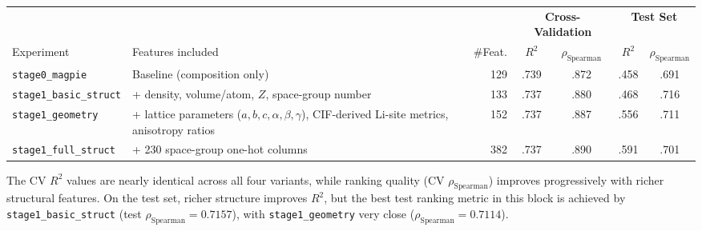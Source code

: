 \documentclass[11pt,a4paper]{article}
\newcommand{\Rtwo}{R^{2}}
\newcommand{\rhoS}{\rho_{\text{Spearman}}}
\begin{document}
\begin{center}
      \footnotesize
      \setlength{\tabcolsep}{3.5pt}
      \begin{tabular}{lp{5cm}rcc|cc}
            \toprule
                                           &                                                                                                    &         & \multicolumn{2}{c|}{\textbf{Cross-Validation}} & \multicolumn{2}{c}{\textbf{Test Set}}                     \\
            Experiment                     & Features included                                                                                  & \#Feat. & $\Rtwo$                                        & $\rhoS$                               & $\Rtwo$ & $\rhoS$ \\
            \midrule
            \texttt{stage0\_magpie}        & Baseline (composition only)                                                                        & 129     & .739                                           & .872                                  & .458    & .691    \\
            \texttt{stage1\_basic\_struct} & + density, volume/atom, $Z$, space-group number                                                    & 133     & .737                                           & .880                                  & .468    & .716    \\
            \texttt{stage1\_geometry}      & + lattice parameters ($a,b,c,\alpha,\beta,\gamma$), CIF-derived Li-site metrics, anisotropy ratios & 152     & .737                                           & .887                                  & .556    & .711    \\
            \texttt{stage1\_full\_struct}  & + 230 space-group one-hot columns                                                                  & 382     & .737                                           & .890                                  & .591    & .701    \\
            \bottomrule
      \end{tabular}
      \setlength{\tabcolsep}{6pt}
\end{center}

The CV $\Rtwo$ values are nearly identical across all four variants, while
ranking quality (CV $\rhoS$) improves progressively with richer structural
features. On the test set, richer structure improves $\Rtwo$, but the best
test ranking metric in this block is achieved by \texttt{stage1\_basic\_struct}
(test $\rhoS = 0.7157$), with \texttt{stage1\_geometry} very close
($\rhoS = 0.7114$).
\end{document}
